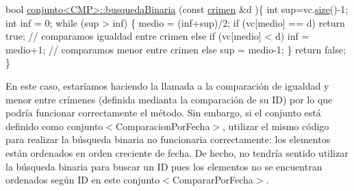 \begin{DoxyCode}
\textcolor{keywordtype}{bool} \hyperlink{classconjunto}{conjunto<CMP>::busquedaBinaria} (\textcolor{keyword}{const} \hyperlink{classcrimen}{crimen} &d )\{
    \textcolor{keywordtype}{int} sup=vc.\hyperlink{classconjunto_aa2d78be0b9fd7aecf1fccf9ad502b907}{size}()-1;
    \textcolor{keywordtype}{int} inf = 0;
    \textcolor{keywordflow}{while} (sup > inf) \{
      medio = (inf+sup)/2;
      \textcolor{keywordflow}{if} (vc[medio] == d) \textcolor{keywordflow}{return} \textcolor{keyword}{true};  \textcolor{comment}{// comparamos igualdad entre crimen}
      \textcolor{keywordflow}{else} \textcolor{keywordflow}{if} (vc[medio] < d) inf = medio+1; \textcolor{comment}{// comparamos menor entre crimen}
      \textcolor{keywordflow}{else} sup = medio-1;
    \}
    \textcolor{keywordflow}{return} \textcolor{keyword}{false};
\}
\end{DoxyCode}
 En este caso, estaríamos haciendo la llamada a la comparación de igualdad y menor entre crímenes (definida medianta la comparación de su I\-D) por lo que podría funcionar correctamente el método. Sin embargo, si el conjunto está definido como conjunto$<$\-Comparacion\-Por\-Fecha$>$, utilizar el mismo código para realizar la búsqueda binaria no funcionaria correctamente\-: los elementos están ordenados en orden creciente de fecha. De hecho, no tendría sentido utilizar la búsqueda binaria para buscar un I\-D pues los elementos no se encuentran ordenados según I\-D en este conjunto$<$\-Comparar\-Por\-Fecha$>$.

